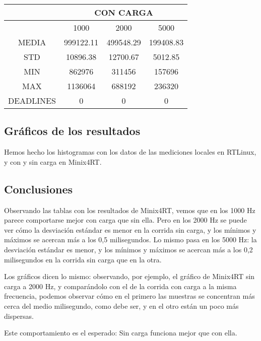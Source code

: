 \begin{center}
\begin{tabular}{|c|c|c|c|}
\hline
&\multicolumn{3}{|c|}{CON CARGA}\\
\hline
&1000&2000&5000\\
\hline
MEDIA&999122.11&499548.29&199408.83\\
\hline
STD&10896.38&12700.67&5012.85\\
\hline
MIN&862976&311456&157696\\
\hline
MAX&1136064&688192&236320\\
\hline
DEADLINES&0&0&0\\
\hline

\end{tabular}
\end{center}


\subsection{Gráficos de los resultados}

Hemos hecho los histogramas con los datos de las mediciones locales en RTLinux,
y con y sin carga en Minix4RT.


\pagebreak
\subsection{Conclusiones}

Observando las tablas con los resultados de Minix4RT, vemos que en los 1000 Hz
parece comportarse mejor con carga que sin ella. Pero en los 2000 Hz se puede
ver cómo la desviación estándar es menor en la corrida sin carga, y los mínimos
y máximos se acercan más a los 0,5 milisegundos. Lo mismo pasa en los 5000 Hz:
la desviación estándar es menor, y los mínimos y máximos se acercan más a los
0,2 milisegundos en la corrida sin carga que en la otra.

Los gráficos dicen lo mismo: observando, por ejemplo, el gráfico de Minix4RT
sin carga a 2000 Hz, y comparándolo con el de la corrida con carga a la misma
frecuencia, podemos observar cómo en el primero las muestras se concentran más
cerca del medio milisegundo, como debe ser, y en el otro están un poco más
dispersas.

Este comportamiento es el esperado: Sin carga funciona mejor que con ella.

